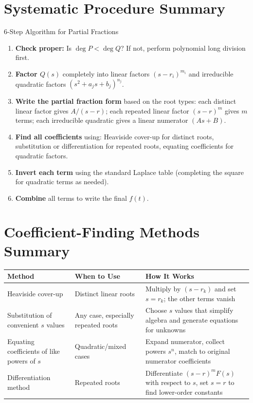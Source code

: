 \documentclass[12pt,a4paper]{article}
\begin{document}
\section{Systematic Procedure Summary}
\begin{infobox}{6-Step Algorithm for Partial Fractions}
\begin{enumerate}[label=\textbf{Step \arabic*.}, leftmargin=*, noitemsep]
  \item \textbf{Check proper:} Is $\deg P < \deg Q$? If not, perform
    polynomial long division first.
  \item \textbf{Factor $Q(s)$} completely into linear factors $(s-r_i)^{m_i}$
    and irreducible quadratic factors $(s^2+a_j s+b_j)^{n_j}$.
  \item \textbf{Write the partial fraction form} based on the root types:
    each distinct linear factor gives $A/(s-r)$; each repeated linear
    factor $(s-r)^m$ gives $m$ terms; each irreducible quadratic gives
    a linear numerator $(As+B)$.
  \item \textbf{Find all coefficients} using: Heaviside cover-up for
    distinct roots, substitution or differentiation for repeated roots,
    equating coefficients for quadratic factors.
  \item \textbf{Invert each term} using the standard Laplace table
    (completing the square for quadratic terms as needed).
  \item \textbf{Combine} all terms to write the final $f(t)$.
\end{enumerate}
\end{infobox}

\section{Coefficient-Finding Methods Summary}
\begin{center}
\begin{tabular}{@{}p{4cm}p{3.5cm}p{6cm}@{}}
\toprule
\textbf{Method} & \textbf{When to Use} & \textbf{How It Works} \\
\midrule
Heaviside cover-up &
  Distinct linear roots &
  Multiply by $(s-r_k)$ and set $s=r_k$; the other terms vanish \\
Substitution of convenient $s$ values &
  Any case, especially repeated roots &
  Choose $s$ values that simplify algebra and generate equations for
  unknowns \\
Equating coefficients of like powers of $s$ &
  Quadratic/mixed cases &
  Expand numerator, collect powers $s^n$, match to original numerator
  coefficients \\
Differentiation method &
  Repeated roots &
  Differentiate $(s-r)^m F(s)$ with respect to $s$, set $s=r$ to
  find lower-order constants \\
\bottomrule
\end{tabular}
\end{center}
\end{document}
